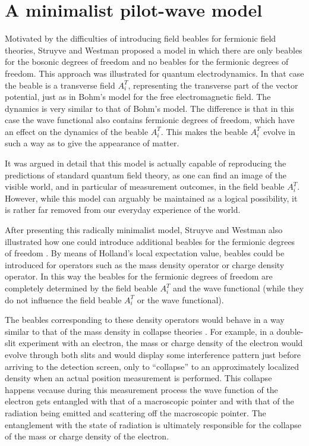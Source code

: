 \documentclass[12pt]{article}
\begin{document}
\section{A minimalist pilot-wave model}\label{minimalist}
Motivated by the difficulties of introducing field beables for fermionic field theories, Struyve and Westman \cite{struyve06,struyve07c} proposed a model in which there are only beables for the bosonic degrees of freedom and no beables for the fermionic degrees of freedom. This approach was illustrated for quantum electrodynamics. In that case the beable is a transverse field $A^T_i$, representing the transverse part of the vector potential, just as in Bohm's model for the free electromagnetic field. The dynamics is very similar to that of Bohm's model. The difference is that in this case the wave functional also contains fermionic degrees of freedom, which have an effect on the dynamics of the beable $A^T_i$. This makes the beable $A^T_i$ evolve in such a way as to give the appearance of matter.  

It was argued in detail that this model is actually capable of reproducing the predictions of standard quantum field theory, as one can find an image of the visible world, and in particular of measurement outcomes, in the field beable $A^T_i$. However, while this model can arguably be maintained as a logical possibility, it is rather far removed from our everyday experience of the world. 

After presenting this radically minimalist model, Struyve and Westman also illustrated how one could introduce additional beables for the fermionic degrees of freedom \cite{struyve07c}. By means of Holland's local expectation value, beables could be introduced for operators such as the mass density operator or charge density operator. In this way the beables for the fermionic degrees of freedom are completely determined by the field beable $A^T_i$ and the wave functional (while they do not influence the field beable $A^T_i$ or the wave functional).

The beables corresponding to these density operators would behave in a way similar to that of the mass density in collapse theories \cite{bassi03}. For example, in a double-slit experiment with an electron, the mass or charge density of the electron would evolve through both slits and would display some interference pattern just before arriving to the detection screen, only to ``collapse'' to an approximately localized density when an actual position measurement is performed. This collapse happens vecause during this measurement process the wave function of the electron gets entangled with that of a macroscopic pointer and with that of the radiation being emitted and scattering off the macroscopic pointer. The entanglement with the state of radiation is ultimately responsible for the collapse of the mass or charge density of the electron.  
\end{document}
